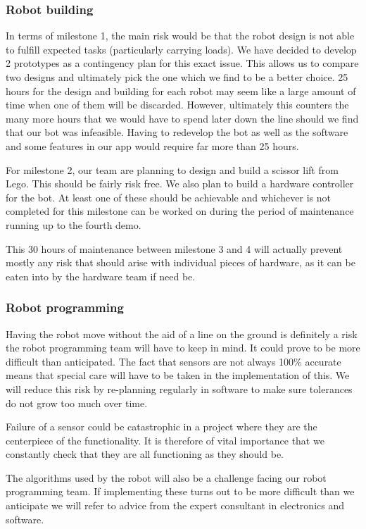 \documentclass{article}
\begin{document}
\subsubsection{Robot building}

In terms of milestone 1, the main risk would be that the robot design is not able to fulfill expected tasks (particularly carrying loads). We have decided to develop 2 prototypes as a contingency plan for this exact issue. This allows us to compare two designs and ultimately pick the one which we find to be a better choice. 25 hours for the design and building for each robot may seem like a large amount of time when one of them will be discarded. However, ultimately this counters the many more hours that we would have to spend later down the line should we find that our bot was infeasible. Having to redevelop the bot as well as the software and some features in our app would require far more than 25 hours.

For milestone 2, our team are planning to design and build a scissor lift from Lego. This should be fairly risk free. We also plan to build a hardware controller for the bot. At least one of these should be achievable and whichever is not completed for this milestone can be worked on during the period of maintenance running up to the fourth demo.

This 30 hours of maintenance between milestone 3 and 4 will actually prevent mostly any risk that should arise with individual pieces of hardware, as it can be eaten into by the hardware team if need be.

\subsubsection{Robot programming}

Having the robot move without the aid of a line on the ground is definitely a risk the robot programming team will have to keep in mind. It could prove to be more difficult than anticipated. The fact that sensors are not always 100\% accurate means that special care will have to be taken in the implementation of this. We will reduce this risk by re-planning regularly in software to make sure tolerances do not grow too much over time. 

Failure of a sensor could be catastrophic in a project where they are the centerpiece of the functionality. It is therefore of vital importance that we constantly check that they are all functioning as they should be.

The algorithms used by the robot will also be a challenge facing our robot programming team. If implementing these turns out to be more difficult than we anticipate we will refer to advice from the expert consultant in electronics and software.
\end{document}
